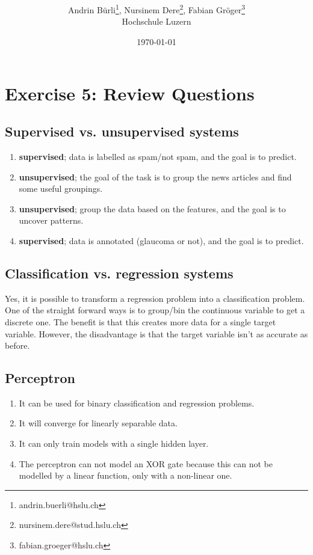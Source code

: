 \documentclass[onecolumn]{article}
\title{\spacecaps{Lab report: SW01 }\\ \normalsize \spacesc{TSM\_DeLearn} }
\author{Andrin Bürli\thanks{andrin.buerli@hslu.ch}, Nursinem Dere\thanks{nursinem.dere@stud.hslu.ch}, Fabian Gröger\thanks{fabian.groeger@hslu.ch}\\Hochschule Luzern}
\date{\today}
\begin{document}
\maketitle

\section{Exercise 5: Review Questions}

\subsection{Supervised vs. unsupervised systems}
\begin{enumerate}[label=(\alph*)]
	\item \textbf{supervised}; data is labelled as spam/not spam, and the goal is to predict.
	\item \textbf{unsupervised}; the goal of the task is to group the news articles and find some useful groupings.
	\item \textbf{unsupervised}; group the data based on the features, and the goal is to uncover patterns.
	\item \textbf{supervised}; data is annotated (glaucoma or not), and the goal is to predict.
\end{enumerate}

\subsection{Classification vs. regression systems}
Yes, it is possible to transform a regression problem into a classification problem. One of the straight forward ways is to group/bin the continuous variable to get a discrete one. The benefit is that this creates more data for a single target variable. However, the disadvantage is that the target variable isn't as accurate as before. 

\subsection{Perceptron}
\begin{enumerate}[label=(\alph*)]
	\item It can be used for binary classification and regression problems.
	\item It will converge for linearly separable data.
	\item It can only train models with a single hidden layer.
	\item The perceptron can not model an XOR gate because this can not be modelled by a linear function, only with a non-linear one.
\end{enumerate}
\end{document}
